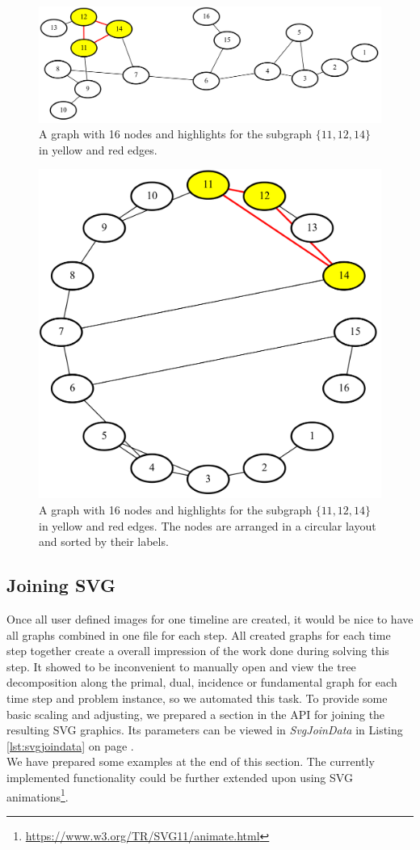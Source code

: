 \documentclass[a4paper, 12pt, bibliography=totoc]{scrartcl}
\begin{document}
\begin{figure}[H]
	\includegraphics[width=\linewidth]{images/minvc16graph9.png}
	\caption{A graph with 16 nodes and highlights for the subgraph $\{11,12,14\}$ in yellow and red edges.}
	\label{fig:minvc16graph9}
\end{figure}

\begin{figure}[H]
	\centering
	\includegraphics[width=0.6\linewidth]{images/minvc16graph9sorted.png}
	\caption{A graph with 16 nodes and highlights for the subgraph $\{11,12,14\}$ in yellow and red edges. The nodes are arranged in a circular layout and sorted by their labels.}
	\label{fig:minvc16graph9sorted}
\end{figure}

\subsection{Joining SVG}\label{sec:svgjoin}
Once all user defined images for one timeline are created, it would be nice to have all graphs combined in one file for each step. All created graphs for each time step together create a overall impression of the work done during solving this step. It showed to be inconvenient to manually open and view the tree decomposition along the primal, dual, incidence or fundamental graph for each time step and problem instance, so we automated this task.
 To provide some basic scaling and adjusting, we prepared a section in the API for joining the resulting SVG graphics.
Its parameters can be viewed in \textit{SvgJoinData} in Listing \ref{lst:svgjoindata} on page \pageref{lst:svgjoindata}. \\
We have prepared some examples at the end of this section.
The currently implemented functionality could be further extended upon using SVG animations\footnote{\url{https://www.w3.org/TR/SVG11/animate.html}}.\\
\end{document}
